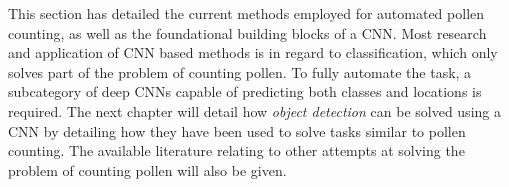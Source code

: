 This section has detailed the current methods employed for automated pollen counting, as well as the foundational building blocks of a CNN\@.
Most research and application of CNN based methods is in regard to classification, which only solves part of the problem of counting pollen.
To fully automate the task, a subcategory of deep CNNs capable of predicting both classes and locations is required.
The next chapter will detail how \textit{object detection} can be solved using a CNN by detailing how they have been used to solve tasks similar to pollen counting.
The available literature relating to other attempts at solving the problem of counting pollen will also be given.

